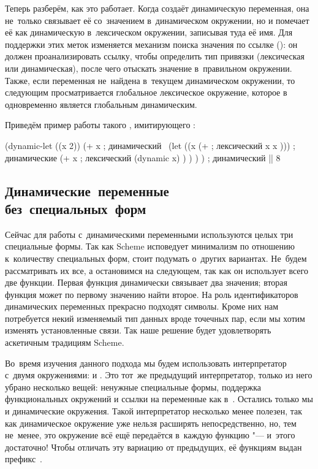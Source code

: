 Теперь разберём, как это работает. Когда  создаёт динамическую
переменная, она не~только связывает её со~значением в~динамическом окружении, но
и помечает её как динамическую в~лексическом окружении, записывая туда её имя.
Для поддержки этих меток изменяется механизм поиска значения по ссылке
(): он должен проанализировать ссылку, чтобы определить тип
привязки (лексическая или динамическая), после чего отыскать значение
в~правильном окружении. Также, если переменная не~найдена в~текущем динамическом
окружении, то следующим просматривается глобальное лексическое окружение,
которое в~{\CommonLisp} одновременно является глобальным динамическим.

Приведём пример работы такого , имитирующего {\CommonLisp}:

\begin{code:lisp}
(dynamic-let ((x 2))
  (+ x                        ; динамический~
     (let ((x (+              ; лексический
                 x x )))      ; динамические
       (+ x                   ; лексический
          (dynamic x) ) ) ) ) ; динамический
|\is| 8
\end{code:lisp}


\subsection{Динамические~переменные без~специальных~форм}%
\label{lisp1-2-omega/namespaces/ssect:dyn-vars-no-special}

Сейчас для работы с~динамическими переменными используются целых три специальные
формы. Так как Scheme исповедует минимализм по отношению к~количеству
специальных форм, стоит подумать о~других вариантах. Не~будем рассматривать их
все, а остановимся на следующем, так как он использует всего две функции. Первая
функция динамически связывает два значения; вторая функция может по первому
значению найти второе. На роль идентификаторов динамических переменных прекрасно
подходят символы. Кроме них нам потребуется некий изменяемый тип данных вроде
точечных пар, если мы хотим изменять установленные связи. Так наше решение будет
удовлетворять аскетичным традициям Scheme.

Во~время изучения данного подхода мы будем использовать интерпретатор с~двумя
окружениями:  и . Это тот~же предыдущий интерпретатор, только
из него убрано несколько вещей: ненужные специальные формы, поддержка
функциональных окружений и ссылки на переменные как в~{\CommonLisp}. Остались
только мы и динамические окружения. Такой интерпретатор несколько менее полезен,
так как динамическое окружение уже нельзя расширять непосредственно, но, тем
не~менее, это окружение всё ещё передаётся в~каждую функцию "--- и~этого
достаточно! Чтобы отличать эту вариацию от предыдущих, её функциям выдан
префикс~.

